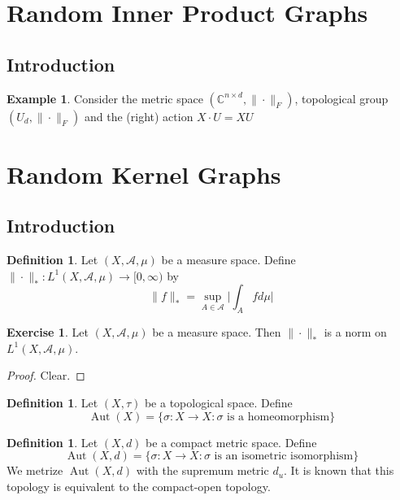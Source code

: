 \documentclass[12pt]{amsart}
\theoremstyle{definition}
\newtheorem{defn}[definition]{Definition}
\newtheorem{ex}[definition]{Exercise}
\newtheorem{exm}[definition]{Example}
\newcommand{\sig}{\sigma}
\newcommand{\C}{\mathbb{C}}
\newcommand{\MA}{\mathcal{A}}
\newcommand{\Rg}{[0,\infty)}
\DeclareMathOperator{\Aut}{Aut}
\begin{document}
	
	
	
	
	
	
	
	
	
	
	
	
	\newpage
	\section{Random Inner Product Graphs}
	\subsection{Introduction}
	
	\begin{exm}
	Consider the metric space $(\C^{n \times d}, \|\cdot\|_F)$, topological group $(U_d, \|\cdot\|_F)$ and  the (right) action $X \cdot U = XU$
	\end{exm}
	
	
	
	
	
	
	
	
	
	
	
	
	\newpage
	\section{Random Kernel Graphs}	
	\subsection{Introduction}
	\begin{defn}
	Let $(X, \MA, \mu)$ be a measure space. Define $\| \cdot \|_*: L^1(X, \MA, \mu) \rightarrow \Rg$ by  
	 $$\| f \|_* = \sup_{A \in \MA} \bigg | \int_A f d\mu \bigg |$$ 
	\end{defn}
	
	\begin{ex}
	Let $(X, \MA, \mu)$ be a measure space. Then $\| \cdot \|_*$ is a norm on $L^1(X, \MA, \mu)$.
	\end{ex}
	
	\begin{proof}
	Clear.
	\end{proof}
	
	\begin{defn}
	Let $(X, \tau)$ be a topological space. Define $$\Aut(X) = \{\sig:X\rightarrow X: \sig \text{ is a homeomorphism} \}$$ 
	\end{defn}	
	
	\begin{defn}
	Let $(X, d)$ be a compact metric space. Define 
	$$\Aut(X, d) = \{\sig:X\rightarrow X: \sig \text{ is an isometric isomorphism} \}$$  
	We metrize $\Aut(X, d)$ with the supremum metric $d_u$. It is known that this topology is equivalent to the compact-open topology.
	\end{defn}
	
\end{document}

